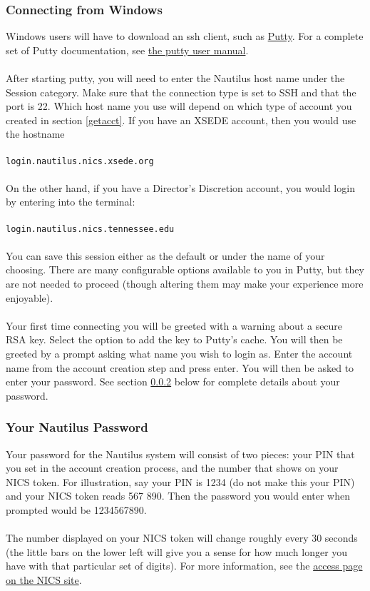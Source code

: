 \subsubsection{Connecting from Windows}\label{confromwin}
Windows users will have to download an ssh client, such as \href{http://www.chiark.greenend.org.uk/~sgtatham/putty/}{Putty}.  For a complete set of Putty documentation, see \href{http://the.earth.li/~sgtatham/putty/0.62/htmldoc/}{the putty user manual}.\\\\
%
After starting putty, you will need to enter the Nautilus host name under the Session category.  Make sure that the connection type is set to SSH and that the port is 22.  Which host name you use will depend on which type of account you created in section \ref{getacct}.  If you have an XSEDE account, then you would use the hostname\\\\
%
\texttt{login.nautilus.nics.xsede.org}
\\\\
On the other hand, if you have a Director's Discretion account, you would login by entering into the terminal:\\\\
%
\texttt{login.nautilus.nics.tennessee.edu}
\\\\
You can save this session either as the default or under the name of your choosing.  There are many configurable options available to you in Putty, but they are not needed to proceed (though altering them may make your experience more enjoyable).\\\\
%
Your first time connecting you will be greeted with a warning about a secure RSA key.  Select the option to add the key to Putty's cache.  You will then be greeted by a prompt asking what name you wish to login as.  Enter the account name from the account creation step and press enter.  You will then be asked to enter your password.  See section \ref{nautpw} below for complete details about your password.

\subsubsection{Your Nautilus Password}\label{nautpw}
Your password for the Nautilus system will consist of two pieces:  your PIN that you set in the account creation process, and the number that shows on your NICS token.  For illustration, say your PIN is 1234 (do not make this your PIN) and your NICS token reads 567 890.  Then the password you would enter when prompted would be 1234567890.\\\\
%
The number displayed on your NICS token will change roughly every 30 seconds (the little bars on the lower left will give you a sense for how much longer you have with that particular set of digits).  For more information, see the \href{http://www.nics.tennessee.edu/getting-started/access#OTPAuthentication}{access page on the NICS site}.


